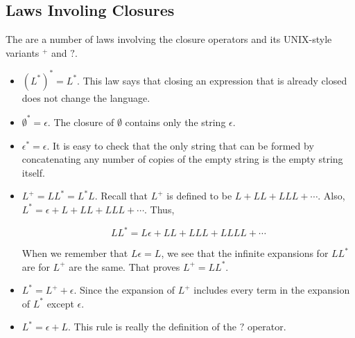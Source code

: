 \documentclass[]{article}
\begin{document}
  \subsection*{Laws Involing Closures}
    The are a number of laws involving the closure operators and its UNIX-style
    variants $^+$ and $?$.
    \begin{itemize}
      \item $(L^*)^* = L^*$. This law says that closing an expression that is
      already closed does not change the language.
      \item $\emptyset^* = \epsilon$. The closure of $\emptyset$ contains only
      the string $\epsilon$.
      \item $\epsilon^* = \epsilon$. It is easy to check that the only string
      that can be formed by concatenating any number of copies of the empty
      string is the empty string itself.
      \item $L^+ = LL^* = L^*L$. Recall that $L^+$ is defined to be
      $L+LL+LLL+\cdots$. Also, $L^* = \epsilon + L + LL + LLL + \cdots.$ Thus,

        \[ LL^* = L\epsilon + LL + LLL + LLLL + \cdots \]

      When we remember that $L\epsilon = L$, we see that the infinite expansions
      for $LL^*$ are for $L^+$ are the same. That proves $L^+ = LL^*$.
      \item $L^* = L^+ + \epsilon$. Since the expansion of $L^+$ includes every
      term in the expansion of $L^*$ except $\epsilon$.
      \item $L^* = \epsilon + L$. This rule is really the definition of the $?$
      operator.
    \end{itemize}
\end{document}
